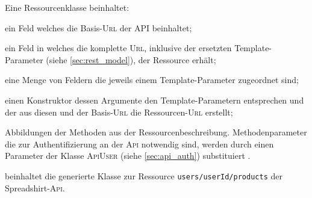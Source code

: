 Eine Ressourcenklasse beinhaltet:
\begin{compactitem}
    \item[\ding{202}] ein Feld welches die Basis-\textsc{Url} der API beinhaltet;
    \item[\ding{203}] ein Feld in welches die komplette \textsc{Url}, inklusive der ersetzten Template-Parameter (siehe \cref{sec:rest_model}), der Ressource erhält;
    \item[\ding{204}] eine Menge von Feldern die jeweils einem Template-Parameter zugeordnet sind;
    \item[\ding{205}] einen Konstruktor dessen Argumente den Template-Parametern entsprechen und der aus diesen und der Basis-\textsc{Url} die Ressourcen-\textsc{Url} erstellt;
    \item[\ding{206}] Abbildungen der Methoden aus der Ressourcenbeschreibung. Methodenparameter die zur Authentifizierung an der \textsc{Api} notwendig sind, werden durch einen Parameter der Klasse \textsc{ApiUser} (siehe \cref{sec:api_auth}) substituiert .
\end{compactitem}

 beinhaltet die generierte Klasse zur Ressource \texttt{users/{userId}/products} der Spreadshirt-\textsc{Api}.

